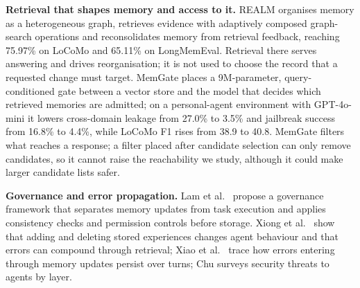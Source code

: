 \IfFileExists{IEEEtran.cls}{\documentclass[journal]{IEEEtran}\def\HAVEIEEE{1}}{\documentclass[10pt,twocolumn]{article}\usepackage[margin=0.7in,columnsep=0.25in]{geometry}}
\begin{document}
\textbf{Retrieval that shapes memory and access to it.} REALM \cite{song2026realm} organises memory as a heterogeneous graph, retrieves evidence with adaptively composed graph-search operations and reconsolidates memory from retrieval feedback, reaching 75.97\% on LoCoMo and 65.11\% on LongMemEval. Retrieval there serves answering and drives reorganisation; it is not used to choose the record that a requested change must target. MemGate \cite{zhang2026memgate} places a 9M-parameter, query-conditioned gate between a vector store and the model that decides which retrieved memories are admitted; on a personal-agent environment with GPT-4o-mini it lowers cross-domain leakage from 27.0\% to 3.5\% and jailbreak success from 16.8\% to 4.4\%, while LoCoMo F1 rises from 38.9 to 40.8. MemGate filters what reaches a response; a filter placed after candidate selection can only remove candidates, so it cannot raise the reachability we study, although it could make larger candidate lists safer.

\textbf{Governance and error propagation.} Lam et al.\ \cite{lam2026ssgm} propose a governance framework that separates memory updates from task execution and applies consistency checks and permission controls before storage. Xiong et al.\ \cite{xiong2025memory} show that adding and deleting stored experiences changes agent behaviour and that errors can compound through retrieval; Xiao et al.\ \cite{xiao2026errors} trace how errors entering through memory updates persist over turns; Chu \cite{chu2026survey} surveys security threats to agents by layer.
\end{document}
